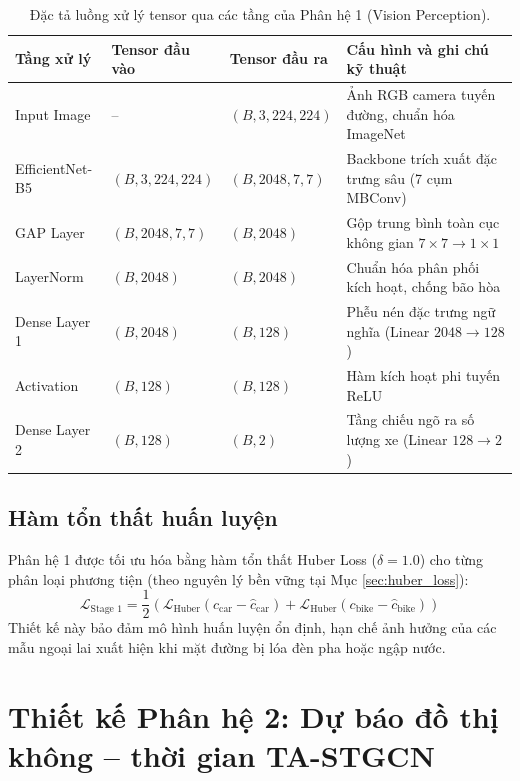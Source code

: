 \begin{table}[htbp]
\centering
\caption{Đặc tả luồng xử lý tensor qua các tầng của Phân hệ 1 (Vision Perception).}
\label{tab:layer_spec_stage1}
\small
\begin{tabularx}{\textwidth}{l l l X}
\toprule
\textbf{Tầng xử lý} & \textbf{Tensor đầu vào} & \textbf{Tensor đầu ra} & \textbf{Cấu hình và ghi chú kỹ thuật} \\
\midrule
Input Image & -- & $(B, 3, 224, 224)$ & Ảnh RGB camera tuyến đường, chuẩn hóa ImageNet \\
EfficientNet-B5 & $(B, 3, 224, 224)$ & $(B, 2048, 7, 7)$ & Backbone trích xuất đặc trưng sâu (7 cụm MBConv) \\
GAP Layer & $(B, 2048, 7, 7)$ & $(B, 2048)$ & Gộp trung bình toàn cục không gian $7 \times 7 \to 1 \times 1$ \\
LayerNorm & $(B, 2048)$ & $(B, 2048)$ & Chuẩn hóa phân phối kích hoạt, chống bão hòa \\
Dense Layer 1 & $(B, 2048)$ & $(B, 128)$ & Phễu nén đặc trưng ngữ nghĩa (Linear $2048 \to 128$) \\
Activation & $(B, 128)$ & $(B, 128)$ & Hàm kích hoạt phi tuyến ReLU \\
Dense Layer 2 & $(B, 128)$ & $(B, 2)$ & Tầng chiếu ngõ ra số lượng xe (Linear $128 \to 2$) \\
\bottomrule
\end{tabularx}
\end{table}

\subsection{Hàm tổn thất huấn luyện}
Phân hệ 1 được tối ưu hóa bằng hàm tổn thất Huber Loss ($\delta = 1.0$) cho từng phân loại phương tiện (theo nguyên lý bền vững tại Mục \ref{sec:huber_loss}):
\begin{equation}
    \mathcal{L}_{\text{Stage 1}} = \frac{1}{2} \left( \mathcal{L}_{\mathrm{Huber}}(c_{\text{car}} - \hat{c}_{\text{car}}) + \mathcal{L}_{\mathrm{Huber}}(c_{\text{bike}} - \hat{c}_{\text{bike}}) \right)
\end{equation}
Thiết kế này bảo đảm mô hình huấn luyện ổn định, hạn chế ảnh hưởng của các mẫu ngoại lai xuất hiện khi mặt đường bị lóa đèn pha hoặc ngập nước.

\section{Thiết kế Phân hệ 2: Dự báo đồ thị không -- thời gian TA-STGCN}
\label{sec:giai_doan_2_tastgcn}

